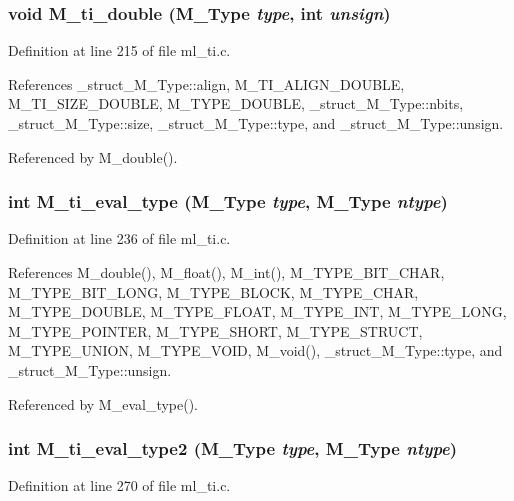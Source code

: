 \subsubsection{\setlength{\rightskip}{0pt plus 5cm}void M\_\-ti\_\-double (\bf{M\_\-Type} {\em type}, int {\em unsign})}\label{ml__ti_8c_2c690d4b5e43377e69836dc0c2f6b026}




Definition at line 215 of file ml\_\-ti.c.

References \_\-struct\_\-M\_\-Type::align, M\_\-TI\_\-ALIGN\_\-DOUBLE, M\_\-TI\_\-SIZE\_\-DOUBLE, M\_\-TYPE\_\-DOUBLE, \_\-struct\_\-M\_\-Type::nbits, \_\-struct\_\-M\_\-Type::size, \_\-struct\_\-M\_\-Type::type, and \_\-struct\_\-M\_\-Type::unsign.

Referenced by M\_\-double().
\subsubsection{\setlength{\rightskip}{0pt plus 5cm}int M\_\-ti\_\-eval\_\-type (\bf{M\_\-Type} {\em type}, \bf{M\_\-Type} {\em ntype})}\label{ml__ti_8c_6856ac6a1fe6d45d21afa1c9d289ce7c}




Definition at line 236 of file ml\_\-ti.c.

References M\_\-double(), M\_\-float(), M\_\-int(), M\_\-TYPE\_\-BIT\_\-CHAR, M\_\-TYPE\_\-BIT\_\-LONG, M\_\-TYPE\_\-BLOCK, M\_\-TYPE\_\-CHAR, M\_\-TYPE\_\-DOUBLE, M\_\-TYPE\_\-FLOAT, M\_\-TYPE\_\-INT, M\_\-TYPE\_\-LONG, M\_\-TYPE\_\-POINTER, M\_\-TYPE\_\-SHORT, M\_\-TYPE\_\-STRUCT, M\_\-TYPE\_\-UNION, M\_\-TYPE\_\-VOID, M\_\-void(), \_\-struct\_\-M\_\-Type::type, and \_\-struct\_\-M\_\-Type::unsign.

Referenced by M\_\-eval\_\-type().
\subsubsection{\setlength{\rightskip}{0pt plus 5cm}int M\_\-ti\_\-eval\_\-type2 (\bf{M\_\-Type} {\em type}, \bf{M\_\-Type} {\em ntype})}\label{ml__ti_8c_e6b3ba73eda8743a3e29607bc070ba26}




Definition at line 270 of file ml\_\-ti.c.

